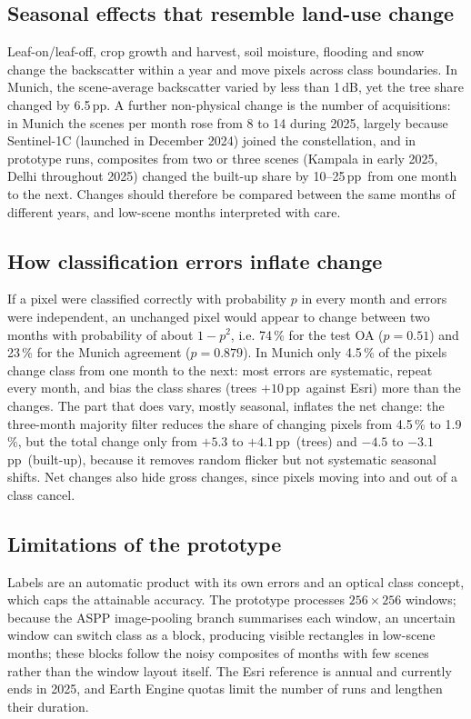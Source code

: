 \documentclass[12pt,conference]{IEEEtran}
\newcommand{\pp}{\,pp}
\begin{document}
\subsection{Seasonal effects that resemble land-use change}

Leaf-on/leaf-off, crop growth and harvest, soil moisture, flooding and snow change the backscatter within a year and
move pixels across class boundaries. In Munich, the scene-average backscatter varied by less than 1\,dB, yet the tree
share changed by 6.5\pp. A further non-physical change is the number of acquisitions: in Munich the scenes per month
rose from 8 to 14 during 2025, largely because Sentinel-1C (launched in December 2024) joined the constellation, and
in prototype runs, composites from two or three scenes (Kampala in early 2025, Delhi throughout 2025)
changed the built-up share by 10--25\pp~from one month to the next. Changes should therefore be compared between the same
months of different years, and low-scene months interpreted with care.

\subsection{How classification errors inflate change}

If a pixel were classified correctly with probability $p$ in every month and errors were independent, an unchanged
pixel would appear to change between two months with probability of about $1-p^2$, i.e. 74\,\% for the test OA
($p=0.51$) and 23\,\% for the Munich agreement ($p=0.879$). In Munich only 4.5\,\% of the pixels change class from one
month to the next: most errors are systematic, repeat every month, and bias the class shares (trees $+10$\pp~against
Esri) more than the changes. The part that does vary, mostly seasonal, inflates the net change: the three-month majority
filter reduces the share of changing pixels from 4.5\,\% to 1.9\,\%, but the total change only from $+5.3$ to
$+4.1$\pp~(trees) and $-4.5$ to $-3.1$\pp~(built-up), because it removes random flicker but not systematic seasonal
shifts. Net changes also hide gross changes, since pixels moving into and out of a class cancel.

\subsection{Limitations of the prototype}

Labels are an automatic product with its own errors and an optical class concept, which caps the attainable accuracy.
The prototype processes $256\times256$ windows; because the ASPP image-pooling branch summarises each window, an
uncertain window can switch class as a block, producing visible rectangles in low-scene months; these blocks follow
the noisy composites of months with few scenes rather than the window layout itself. The Esri reference is annual and
currently ends in 2025, and Earth Engine quotas limit the number of runs and lengthen their duration.
\end{document}
